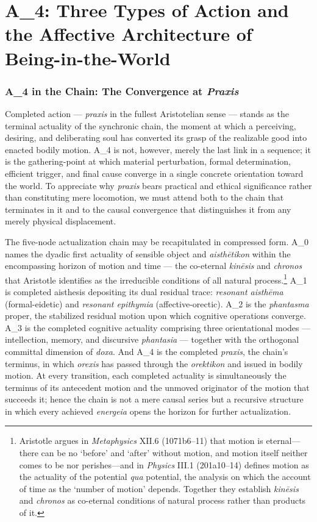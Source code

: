 \documentclass{article}
\begin{document}
\section{A\_4: Three Types of Action and the Affective Architecture of Being-in-the-World}

\subsubsection*{A\_4 in the Chain: The Convergence at \textit{Praxis}}

Completed action --- \textit{praxis} in the fullest Aristotelian sense --- stands as the terminal actuality of the synchronic chain, the moment at which a perceiving, desiring, and deliberating soul has converted its grasp of the realizable good into enacted bodily motion. A\_4 is not, however, merely the last link in a sequence; it is the gathering-point at which material perturbation, formal determination, efficient trigger, and final cause converge in a single concrete orientation toward the world. To appreciate why \textit{praxis} bears practical and ethical significance rather than constituting mere locomotion, we must attend both to the chain that terminates in it and to the causal convergence that distinguishes it from any merely physical displacement.

The five-node actualization chain may be recapitulated in compressed form. A\_0 names the dyadic first actuality of sensible object and \textit{aisth\={e}tikon} within the encompassing horizon of motion and time --- the co-eternal \textit{kin\={e}sis} and \textit{chronos} that Aristotle identifies as the irreducible conditions of all natural process.\footnote{Aristotle argues in \textit{Metaphysics} XII.6 (1071b6--11) that motion is eternal---there can be no `before' and `after' without motion, and motion itself neither comes to be nor perishes---and in \textit{Physics} III.1 (201a10--14) defines motion as the actuality of the potential \textit{qua} potential, the analysis on which the account of time as the `number of motion' depends. Together they establish \textit{kin\={e}sis} and \textit{chronos} as co-eternal conditions of natural process rather than products of it.} A\_1 is completed aisthesis depositing its dual residual trace: \textit{resonant aisth\={e}ma} (formal-eidetic) and \textit{resonant epithymia} (affective-orectic). A\_2 is the \textit{phantasma} proper, the stabilized residual motion upon which cognitive operations converge. A\_3 is the completed cognitive actuality comprising three orientational modes --- intellection, memory, and discursive \textit{phantasia} --- together with the orthogonal committal dimension of \textit{doxa}. And A\_4 is the completed \textit{praxis}, the chain's terminus, in which \textit{orexis} has passed through the \textit{orektikon} and issued in bodily motion. At every transition, each completed actuality is simultaneously the terminus of its antecedent motion and the unmoved originator of the motion that succeeds it; hence the chain is not a mere causal series but a recursive structure in which every achieved \textit{energeia} opens the horizon for further actualization.
\end{document}
